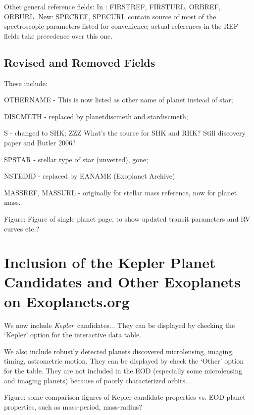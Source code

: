 \documentclass[11pt,preprint]{aastex}
\def\kepler{\textit{Kepler}}
\begin{document}
\begin{CJK*}{UTF8}{gbsn}
Other general reference fields: In \cite{Wright2011}: FIRSTREF,
FIRSTURL, ORBREF, ORBURL. New: SPECREF, SPECURL contain source of most
of the spectroscopic parameters listed for convenience; actual
references in the REF fields take precedence over this one.


\subsection{Revised and Removed Fields}

These include:

OTHERNAME - This is now listed as other name of planet instead of star;

DISCMETH - replaced by planetdiscmeth and stardiscmeth;

S - changed to SHK; ZZZ What's the source for SHK and RHK? Still discovery
paper and Butler 2006?

SPSTAR - stellar type of star (unvetted), gone;

NSTEDID - replaced by EANAME (Exoplanet Archive).

MASSREF, MASSURL - originally for stellar mass reference, now for planet mass.

Figure: Figure of single planet page, to show updated transit
parameters and RV curves etc.?


\section{Inclusion of the Kepler Planet Candidates and Other Exoplanets on Exoplanets.org}\label{sec:kepler}

We now include \kepler\ candidates... They can be displayed by
checking the `Kepler' option for the interactive data table.

We also include robustly detected planets discovered microlensing,
imaging, timing, astrometric motion. They can be displayed by check
the `Other' option for the table. They are not included in the EOD
(especially some microlensing and imaging planets) because of poorly
characterized orbits...

Figure: some comparison figures of Kepler candidate properties
vs. EOD planet properties, such as mass-period, mass-radius?



\end{CJK*}
\end{document}
